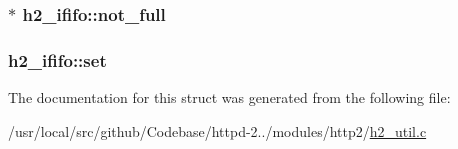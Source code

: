 \subsubsection[{\texorpdfstring{not\+\_\+full}{not_full}}]{$\ast$ h2\+\_\+ififo\+::not\+\_\+full}\hypertarget{structh2__ififo_ab78e5e0f828a1ec7d0a26729812c9031}{}\label{structh2__ififo_ab78e5e0f828a1ec7d0a26729812c9031}
\subsubsection[{\texorpdfstring{set}{set}}]{ h2\+\_\+ififo\+::set}\hypertarget{structh2__ififo_a15eddfaf468031ddf3393777a2356fc1}{}\label{structh2__ififo_a15eddfaf468031ddf3393777a2356fc1}


The documentation for this struct was generated from the following file\+:\begin{DoxyCompactItemize}
\item 
/usr/local/src/github/\+Codebase/httpd-\/2../modules/http2/\hyperlink{h2__util_8c}{h2\+\_\+util.\+c}\end{DoxyCompactItemize}
